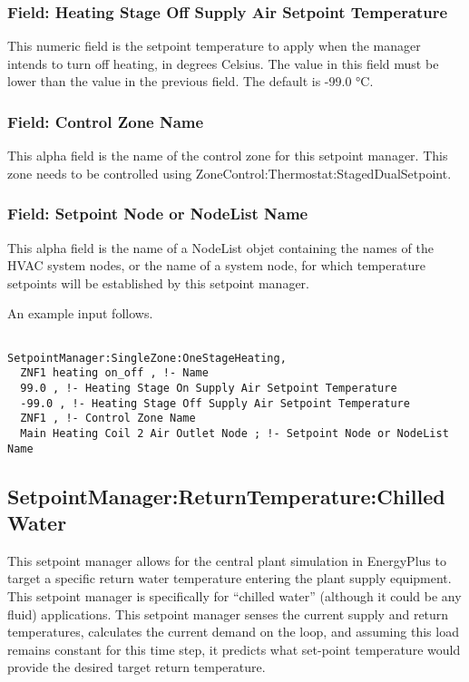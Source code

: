 \subsubsection{Field: Heating Stage Off Supply Air Setpoint Temperature}\label{field-heating-stage-off-supply-air-setpoint-temperature}

This numeric field is the setpoint temperature to apply when the manager intends to turn off heating, in degrees Celsius. The value in this field must be lower than the value in the previous field. The default is -99.0 °C.

\subsubsection{Field: Control Zone Name}\label{field-control-zone-name-4}

This alpha field is the name of the control zone for this setpoint manager. This zone needs to be controlled using ZoneControl:Thermostat:StagedDualSetpoint.

\subsubsection{Field: Setpoint Node or NodeList Name}\label{field-setpoint-node-or-nodelist-name-21}

This alpha field is the name of a NodeList objet containing the names of the HVAC system nodes, or the name of a system node, for which temperature setpoints will be established by this setpoint manager.

An example input follows.

\begin{lstlisting}

SetpointManager:SingleZone:OneStageHeating,
  ZNF1 heating on_off , !- Name
  99.0 , !- Heating Stage On Supply Air Setpoint Temperature
  -99.0 , !- Heating Stage Off Supply Air Setpoint Temperature
  ZNF1 , !- Control Zone Name
  Main Heating Coil 2 Air Outlet Node ; !- Setpoint Node or NodeList Name
\end{lstlisting}

\subsection{SetpointManager:ReturnTemperature:ChilledWater}\label{setpointmanagerreturntemperaturechilledwater}

This setpoint manager allows for the central plant simulation in EnergyPlus to target a specific return water temperature entering the plant supply equipment. This setpoint manager is specifically for ``chilled water'' (although it could be any fluid) applications. This setpoint manager senses the current supply and return temperatures, calculates the current demand on the loop, and assuming this load remains constant for this time step, it predicts what set-point temperature would provide the desired target return temperature.

